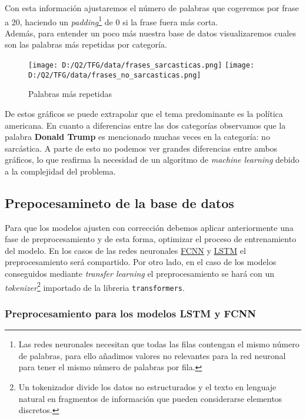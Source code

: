 \documentclass[10pt,riqno,a4paper,twoside]{article}\usepackage[]{graphicx}\usepackage[]{color}
\newcommand{\code}[1]{\texttt{#1}}
\begin{document}
Con esta información ajustaremos el número de palabras que cogeremos por frase a 20, haciendo un \textit{padding}\footnote{Las redes neuronales necesitan que todas las filas contengan el mismo número de palabras, para ello añadimos valores no relevantes para la red neuronal para tener el mismo número de palabras por fila.} de 0 si la frase fuera más corta. \\

Además, para entender un poco más nuestra base de datos visualizaremos cuales son las palabras más repetidas por categoría. 

\begin{figure}[h]
\caption{Palabras más repetidas}
\begin{center}
\texttt{[image: D:/Q2/TFG/data/frases\_sarcasticas.png]}
\texttt{[image: D:/Q2/TFG/data/frases\_no\_sarcasticas.png]}
\end{center}
\end{figure}

De estos gráficos se puede extrapolar que el tema predominante es la política americana. En cuanto a diferencias entre las dos categorías observamos que la palabra \textbf{Donald Trump} es mencionado muchas veces en la categoría: no sarcástica. A parte de esto no podemos ver grandes diferencias entre ambos gráficos, lo que reafirma la necesidad de un algoritmo de \textit{machine learning} debido a la complejidad del problema.

\subsection{Prepocesamineto de la base de datos}

Para que los modelos ajusten con corrección debemos aplicar anteriormente una fase de preprocesamiento y de esta forma, optimizar el proceso de entrenamiento del modelo. En los casos de las redes neuronales \hyperref[red_FCNN]{FCNN} y \hyperref[LSTM_model]{LSTM} el preprocesamiento será compartido. Por otro lado, en el caso de los modelos conseguidos mediante \textit{transfer learning} el preprocesamiento se hará con un \textit{tokenizer}\footnote{Un tokenizador divide los datos no estructurados y el texto en lenguaje natural en fragmentos de información que pueden considerarse elementos discretos.} importado de la libreria \code{transformers}.

\subsubsection{Preprocesamiento para los modelos LSTM y FCNN}
\end{document}
